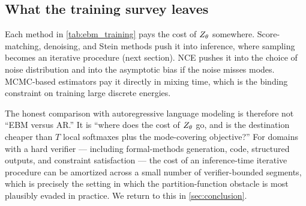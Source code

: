\subsection{What the training survey leaves}
\label{ssec:training_leaves}

Each method in \cref{tab:ebm_training} pays the cost of $Z_\theta$ somewhere.
Score-matching, denoising, and Stein methods push it into inference, where sampling becomes an iterative procedure (next section).
NCE pushes it into the choice of noise distribution and into the asymptotic bias if the noise misses modes.
MCMC-based estimators pay it directly in mixing time, which is the binding constraint on training large discrete energies.

The honest comparison with autoregressive language modeling is therefore not ``EBM versus AR.''
It is ``where does the cost of $Z_\theta$ go, and is the destination cheaper than $T$ local softmaxes plus the mode-covering objective?''
For domains with a hard verifier --- including formal-methods generation, code, structured outputs, and constraint satisfaction --- the cost of an inference-time iterative procedure can be amortized across a small number of verifier-bounded segments, which is precisely the setting in which the partition-function obstacle is most plausibly evaded in practice.
We return to this in \cref{sec:conclusion}.
